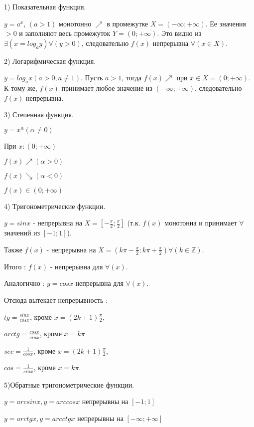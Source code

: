 1) Показательная функция. 

$y=a^x$, $(a>1)$ монотонно $\nearrow$ в промежутке $X=(-\infty;+\infty)$.
Ее значения $>0$ и заполняют весь промежуток $Y=(0;+\infty)$. Это видно из $\exists (x=log_a y)\forall (y>0)$, следовательно $f(x)$ непрерывна $\forall(x \in X)$.

2) Логарифмическая функция. 

$y=log_a x (a>0, a \neq 1)$.
Пусть $a>1$, тогда $f(x)\nearrow$ при $x \in X = (0; +\infty)$. К тому же, $f(x)$ принимает любое значение из $(-\infty;+\infty)$, следовательно $f(x)$ непрерывна.

3) Степенная функция. 

$y=x^\alpha (\alpha \neq 0)$

При $x: (0; +\infty)$

$f(x)\nearrow(\alpha > 0)$

$f(x) \searrow(\alpha < 0)$

$f(x) \in (0; +\infty)$

4) Тригонометрические функции.

$y = sin x$ - непрерывна на $X = [-\frac{\pi}{2};\frac{\pi}{2}]$ (т.к. $f(x)$ монотонна и принимает $\forall$ значений из $[-1;1]$). 

Также $f(x)$ - непрерывна на $ X = (k\pi - \frac{\pi}{2};k\pi + \frac{\pi}{2}) \forall (k \in \mathbb {Z})$.

Итого : $f(x)$ - непрерывна для $\forall (x)$.

Аналогично : $y=cos x$ непрерывна для $\forall (x)$.

Отсюда вытекает непрерывность :

$tg = \frac{sin x}{cos x}$, кроме $x = (2k + 1)\frac{\pi}{2}$,

$arctg = \frac{cos x}{sin x}$, кроме $x = k\pi$

$sec = \frac{1}{cos x}$, кроме $x = (2k + 1)\frac{\pi}{2}$,

$cos = \frac{1}{sin x}$, кроме $x = k\pi$.

5)Обратные тригонометрические функции.

$y = arcsin x, y = arccos x$ непрерывны на $[-1;1]$

$y = arctg x, y = arcctg x$ непрерывны на $[-\infty;+\infty]$
